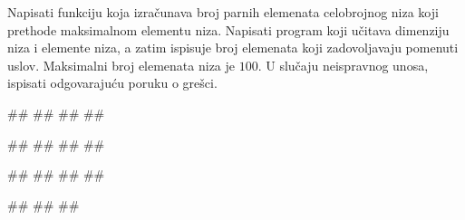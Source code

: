 \begin{Exercise}[label=p.broj_manjih_od_maksimuma] 
 Napisati funkciju koja izračunava broj parnih elemenata celobrojnog niza
 koji prethode maksimalnom elementu niza.
 Napisati program koji učitava dimenziju niza i elemente niza, a zatim ispisuje broj
 elemenata koji zadovoljavaju pomenuti uslov.
 Maksimalni broj elemenata niza je $100$.
U slučaju neispravnog unosa, ispisati odgovarajuću poruku o grešci. 

\begin{miditest}
\begin{upotreba}{1}
#\naslovInt#
##
##
##
\end{upotreba}
\end{miditest}
\begin{miditest}
\begin{upotreba}{2}
#\naslovInt#
##
##
##
\end{upotreba}
\end{miditest}

\begin{miditest}
\begin{upotreba}{3}
#\naslovInt#
##
##
##
\end{upotreba}
\end{miditest}
\begin{miditest}
\begin{upotreba}{4}
#\naslovInt#
##
##
\end{upotreba}
\end{miditest}

\end{Exercise}

\ifresenja
\begin{Answer}[ref=p.broj_manjih_od_maksimuma]
\end{Answer}
\fi


